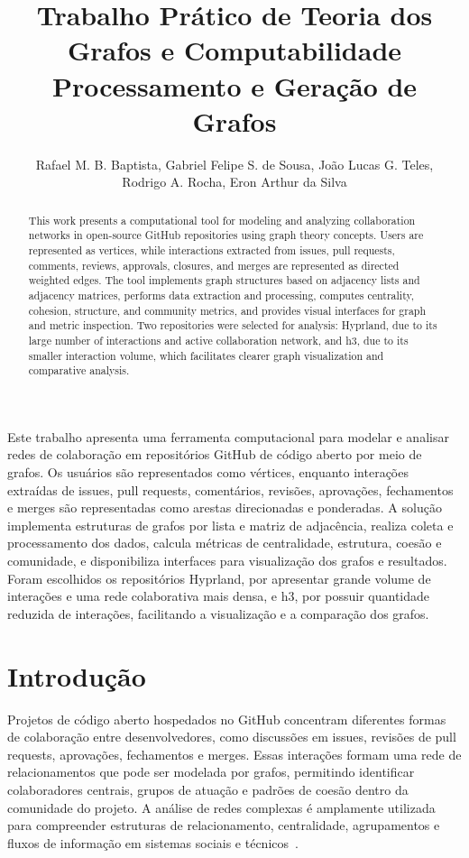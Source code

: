 \documentclass[12pt]{article}
\title{Trabalho Prático de Teoria dos Grafos e Computabilidade\\Processamento e Geração de Grafos}
\author{Rafael M. B. Baptista\inst{1}, Gabriel Felipe S. de Sousa\inst{1}, João Lucas G. Teles\inst{1},
\\Rodrigo A. Rocha\inst{1}, Eron Arthur da Silva\inst{1} }
\begin{document}
 

\maketitle

\begin{abstract}
This work presents a computational tool for modeling and analyzing collaboration
networks in open-source GitHub repositories using graph theory concepts. Users
are represented as vertices, while interactions extracted from issues, pull
requests, comments, reviews, approvals, closures, and merges are represented as
directed weighted edges. The tool implements graph structures based on adjacency
lists and adjacency matrices, performs data extraction and processing, computes
centrality, cohesion, structure, and community metrics, and provides visual
interfaces for graph and metric inspection. Two repositories were selected for
analysis: Hyprland, due to its large number of interactions and active
collaboration network, and h3, due to its smaller interaction volume, which
facilitates clearer graph visualization and comparative analysis.
\end{abstract}
     
\begin{resumo}
Este trabalho apresenta uma ferramenta computacional para modelar e analisar
redes de colaboração em repositórios GitHub de código aberto por meio de grafos.
Os usuários são representados como vértices, enquanto interações extraídas de
issues, pull requests, comentários, revisões, aprovações, fechamentos e merges
são representadas como arestas direcionadas e ponderadas. A solução implementa
estruturas de grafos por lista e matriz de adjacência, realiza coleta e
processamento dos dados, calcula métricas de centralidade, estrutura, coesão e
comunidade, e disponibiliza interfaces para visualização dos grafos e resultados.
Foram escolhidos os repositórios Hyprland, por apresentar grande volume de
interações e uma rede colaborativa mais densa, e h3, por possuir quantidade
reduzida de interações, facilitando a visualização e a comparação dos grafos.
\end{resumo}


\section{Introdução}

Projetos de código aberto hospedados no GitHub concentram diferentes formas de
colaboração entre desenvolvedores, como discussões em issues, revisões de pull
requests, aprovações, fechamentos e merges. Essas interações formam uma rede de
relacionamentos que pode ser modelada por grafos, permitindo identificar
colaboradores centrais, grupos de atuação e padrões de coesão dentro da
comunidade do projeto. A análise de redes complexas é amplamente utilizada para
compreender estruturas de relacionamento, centralidade, agrupamentos e fluxos de
informação em sistemas sociais e técnicos~\cite{newman2010networks}.
\end{document}
